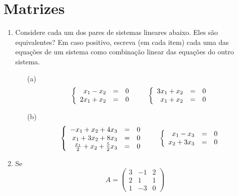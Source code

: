 \documentclass[12pt]{article}
\begin{document}
\section{Matrizes}
\begin{enumerate}
   \item Considere cada um dos pares de sistemas lineares abaixo. Eles são equivalentes? Em caso positivo, escreva (em cada item) cada uma das equações de um sistema como combinação linear das equações do outro sistema.
   \begin{itemize}
      \item[(a)]
      \begin{equation*}
         \left\{
            \begin{array}{r c l}
               x_1 -x_2 &=& 0\\
               2x_1+x_2 &=& 0
            \end{array}
         \right. \qquad \left\{
            \begin{array}{r c l}
               3x_1 + x_2 &=& 0\\
               x_1+x_2 &=& 0
            \end{array}
         \right.
      \end{equation*}
      \item[(b)] 
      \begin{equation*}
         \left\{
            \begin{array}{r c l}
               -x_1 +x_2 +4x_3&=& 0\\
               x_1+3x_2+8x_3 &=& 0\\
               \frac{x_1}{2} + x_2 + \frac{5}{2}x_3 &=& 0
            \end{array}
         \right. \qquad \left\{
            \begin{array}{r c l}
               x_1 - x_3 &=& 0\\
               x_2+3x_3 &=& 0
            \end{array}
         \right.
      \end{equation*}
   \end{itemize}
%
   \item Se 
   \begin{equation*}
      A =
      \begin{pmatrix}
         3 & -1 & 2\\
         2 & 1 & 1\\
         1 & -3 & 0
      \end{pmatrix}
   \end{equation*}

\end{enumerate}
\end{document}
